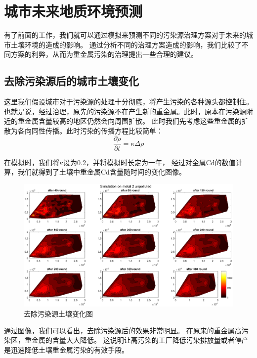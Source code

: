 \documentclass[a4paper]{article}
\begin{document}
\section{城市未来地质环境预测}
有了前面的工作，我们就可以通过模拟来预测不同的污染源治理方案对于未来的城市土壤环境的造成的影响。
通过分析不同的治理方案造成的影响，我们比较了不同方案的利弊，从而为重金属污染的治理提出一些合理的建议。

\subsection{去除污染源后的城市土壤变化}
这里我们假设城市对于污染源的处理十分彻底，将产生污染的各种源头都控制住。
也就是说，经过治理，原先的污染源不在产生新的重金属。此时，原本在污染源附近的重金属含量较高的地区仍然会向周围扩散。
此时我们先考虑这些重金属的扩散为各向同性传播。此时污染的传播方程比较简单：
\begin{equation}
\frac{\partial \rho}{\partial t} = \kappa  \Delta \rho
\end{equation}

在模拟时，我们将$\kappa$设为0.2，并将模拟时长定为一年，
经过对金属Cd的数值计算，我们就得到了土壤中重金属Cd含量随时间的变化图像。
\begin{figure}[H]
    \centerline{
    \includegraphics[scale=0.5]{pictures/unpolluted.eps}}
    \caption{去除污染源土壤变化图}
    \label{fig:unpolluted}
\end{figure}
通过图像，我们可以看出，去除污染源后的效果非常明显。
在原来的重金属高污染区，重金属的含量大大降低。
这说明让高污染的工厂降低污染排放量或者停产是迅速降低土壤重金属污染的有效手段。
\end{document}
